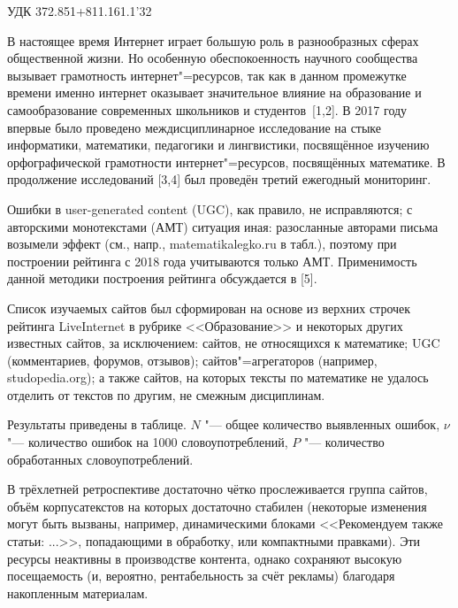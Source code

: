 \small УДК 372.851+811.161.1'32
\vzmscaption


В настоящее время Интернет играет большую роль в разнообразных сферах общественной жизни. Но особенную
обеспокоенность научного сообщества вызывает грамотность интернет"=ресурсов, так как в данном промежутке
времени именно интернет оказывает значительное влияние на образование и самообразование современных школьников и
студентов~[1,2].
В 2017 году впервые было проведено междисциплинарное исследование на стыке информатики, математики, педагогики и
лингвистики, посвящённое изучению орфографической грамотности интернет"=ресурсов, посвящённых математике.
В продолжение исследований [3,4] был проведён третий ежегодный мониторинг.

Ошибки в user-generated content (UGC), как правило, не исправляются;
с авторскими монотекстами (АМТ) ситуация иная:
разосланные авторами письма возымели эффект
(см., напр., \linebreak matematikalegko.ru в табл.),
поэтому при построении рейтинга с 2018 года учитываются только АМТ.
Применимость данной методики построения рейтинга обсуждается в [5].

Список изучаемых сайтов был сформирован на основе из верхних строчек рейтинга LiveInternet в рубрике <<Образование>>
и некоторых других известных сайтов,
за исключением:
сайтов, не относящихся к математике;
UGC (комментариев, форумов, отзывов);
сайтов"=агрегаторов (например, studopedia.org);
а также сайтов, на которых тексты по математике не удалось отделить от текстов по другим,
не смежным дисциплинам.

Результаты приведены в таблице.
$N$ "--- общее количество выявленных ошибок,
$\nu$ "--- количество ошибок на 1000 словоупотреблений,
$P$ "--- количество обработанных словоупотреблений.

В трёхлетней ретроспективе достаточно чётко прослеживается группа сайтов,
объём корпусатекстов на которых достаточно стабилен
(некоторые изменения могут быть вызваны, например,
динамическими блоками <<Рекомендуем также статьи: ...>>,
попадающими в обработку,
или компактными правками).
Эти ресурсы неактивны в производстве контента,
однако сохраняют высокую посещаемость (и, вероятно, рентабельность за счёт рекламы)
благодаря накопленным материалам.


